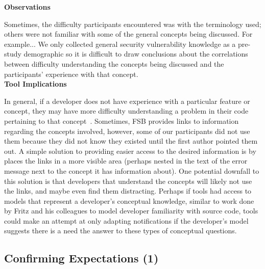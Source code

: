 \documentclass[conference]{IEEEtran}
\begin{document}
\noindent\textbf{Observations}







Sometimes, the difficulty participants encountered was with the terminology used; others were not familiar with some of the general concepts being discussed. For example...
We only collected general security vulnerability knowledge as a pre-study demographic so it is difficult to draw conclusions about the correlations between difficulty understanding the concepts being discussed and the participants' experience with that concept.
\\

\noindent\textbf{Tool Implications}

In general, if a developer does not have experience with a particular feature or concept, they may have more difficulty understanding a problem in their code pertaining to that concept~\cite{wiedenbeck1993mental}.
Sometimes, FSB provides links to information regarding the concepts involved, however, some of our participants did not use them because they did not know they existed until the first author pointed them out. 
A simple solution to providing easier access to the desired information is by places the links in a  more visible area (perhaps nested in the text of the error message next to the concept it has information about). 
One potential downfall to this solution is that developers that understand the concepts will likely not use the links, and maybe even find them distracting.   
Perhaps if tools had access to models that represent a developer's conceptual knowledge, similar to work done by Fritz and his colleagues to model developer familiarity with source code, tools could make an attempt at only adapting notifications if the developer's model suggests there is a need the answer to these types of conceptual questions.



\noindent\subsection{\textbf{Confirming Expectations (1)}}\label{ce}
\end{document}
